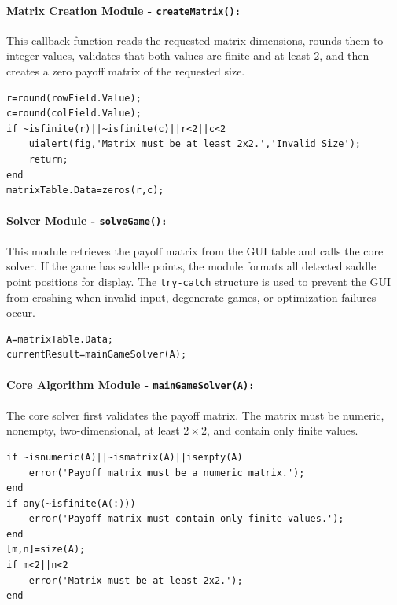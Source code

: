 \paragraph{Matrix Creation Module - \texttt{createMatrix():}}

This callback function reads the requested matrix dimensions, rounds them to integer values, validates that both values are finite and at least \(2\), and then creates a zero payoff matrix of the requested size.

\begin{lstlisting}[style=code]
r=round(rowField.Value);
c=round(colField.Value);
if ~isfinite(r)||~isfinite(c)||r<2||c<2
    uialert(fig,'Matrix must be at least 2x2.','Invalid Size');
    return;
end
matrixTable.Data=zeros(r,c);
\end{lstlisting}

\paragraph{Solver Module - \texttt{solveGame():}}

This module retrieves the payoff matrix from the GUI table and calls the core solver. If the game has saddle points, the module formats all detected saddle point positions for display. The \texttt{try-catch} structure is used to prevent the GUI from crashing when invalid input, degenerate games, or optimization failures occur.

\begin{lstlisting}[style=code]
A=matrixTable.Data;
currentResult=mainGameSolver(A);
\end{lstlisting}

\paragraph{Core Algorithm Module - \texttt{mainGameSolver(A):}}

The core solver first validates the payoff matrix. The matrix must be numeric, nonempty, two-dimensional, at least \(2 \times 2\), and contain only finite values.

\begin{lstlisting}[style=code]
if ~isnumeric(A)||~ismatrix(A)||isempty(A)
    error('Payoff matrix must be a numeric matrix.');
end
if any(~isfinite(A(:)))
    error('Payoff matrix must contain only finite values.');
end
[m,n]=size(A);
if m<2||n<2
    error('Matrix must be at least 2x2.');
end
\end{lstlisting}


